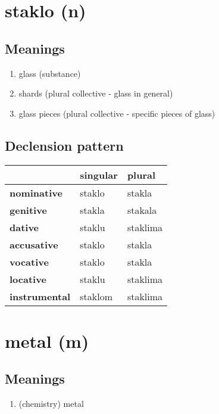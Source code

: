\filbreak
\section{staklo (n)}
\subsection*{Meanings}
\begin{enumerate}
\item glass (substance)
\item shards (plural collective - glass in general)
\item glass pieces (plural collective - specific pieces of glass)
\end{enumerate}
\subsection*{Declension pattern}
\begin{tabularx}{\linewidth}{Xll}
\toprule
{} & singular &    plural \\
\midrule
\textbf{nominative  } &   staklo &    stakla \\
\textbf{genitive    } &   stakla &   stakala \\
\textbf{dative      } &   staklu &  staklima \\
\textbf{accusative  } &   staklo &    stakla \\
\textbf{vocative    } &   staklo &    stakla \\
\textbf{locative    } &   staklu &  staklima \\
\textbf{instrumental} &  staklom &  staklima \\
\bottomrule
\end{tabularx}

\filbreak
\section{metal (m)}
\subsection*{Meanings}
\begin{enumerate}
\item (chemistry) metal
\end{enumerate}
